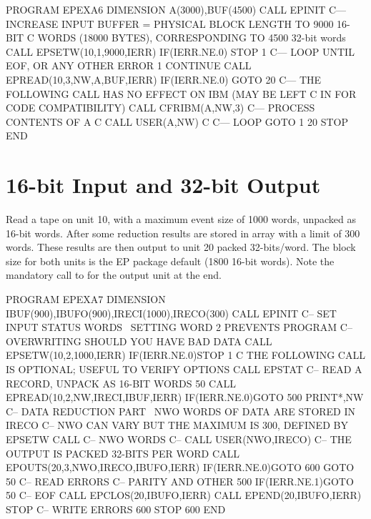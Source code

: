 \begin{XMP}
      PROGRAM EPEXA6
      DIMENSION A(3000),BUF(4500)
      CALL EPINIT
 C--- INCREASE INPUT BUFFER = PHYSICAL BLOCK LENGTH TO 9000 16-BIT
 C    WORDS (18000 BYTES), CORRESPONDING TO 4500 32-bit words
      CALL EPSETW(10,1,9000,IERR)
      IF(IERR.NE.0)  STOP 1
 C--- LOOP UNTIL EOF, OR ANY OTHER ERROR
     1 CONTINUE
      CALL EPREAD(10,3,NW,A,BUF,IERR)
      IF(IERR.NE.0)  GOTO 20
 C--- THE FOLLOWING CALL HAS NO EFFECT ON IBM (MAY BE LEFT
 C    IN FOR CODE COMPATIBILITY)
      CALL CFRIBM(A,NW,3)
 C--- PROCESS CONTENTS OF A
 C
      CALL USER(A,NW)
 C
 C--- LOOP
      GOTO 1
    20 STOP
      END
\end{XMP}

\newpage


\section{16-bit Input and 32-bit Output}

Read a tape on unit 10, with a maximum event size of 1000 words,
unpacked as 16-bit words. 
After some reduction results are stored
in array  with a limit of 300 words. 
These results  are  then output to unit 20 packed 32-bits/word. 
The block size for both
units is the EP package default (1800 16-bit words). 
Note the
mandatory call to  for the output unit at the end. 

\begin{XMP}
      PROGRAM EPEXA7
      DIMENSION IBUF(900),IBUFO(900),IRECI(1000),IRECO(300)
      CALL EPINIT
 C--   SET INPUT STATUS WORDS \ SETTING WORD 2 PREVENTS PROGRAM
 C--   OVERWRITING SHOULD YOU HAVE BAD DATA
      CALL EPSETW(10,2,1000,IERR)
      IF(IERR.NE.0)STOP 1
 C        THE FOLLOWING CALL IS OPTIONAL; USEFUL TO VERIFY OPTIONS
      CALL EPSTAT
 C--   READ A RECORD, UNPACK AS 16-BIT WORDS
  50  CALL EPREAD(10,2,NW,IRECI,IBUF,IERR)
      IF(IERR.NE.0)GOTO 500
      PRINT*,NW
 C--   DATA REDUCTION PART \ NWO WORDS OF DATA ARE STORED IN IRECO
 C--   NWO CAN VARY BUT THE MAXIMUM IS 300, DEFINED BY EPSETW CALL
 C--    NWO WORDS
 C--
      CALL USER(NWO,IRECO)
 C--    THE OUTPUT IS PACKED 32-BITS PER WORD
      CALL EPOUTS(20,3,NWO,IRECO,IBUFO,IERR)
      IF(IERR.NE.0)GOTO 600
      GOTO 50
 C--   READ ERRORS
 C--     PARITY AND OTHER
  500 IF(IERR.NE.1)GOTO 50
 C--     EOF
      CALL EPCLOS(20,IBUFO,IERR)
      CALL EPEND(20,IBUFO,IERR)
      STOP
 C--   WRITE ERRORS
  600 STOP 600
      END
\end{XMP}

